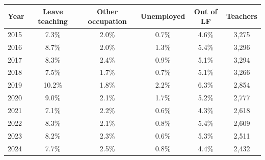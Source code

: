 \begin{tabular}{lccccc}
\toprule
Year & Leave teaching & Other occupation & Unemployed & Out of LF & Teachers \\
\midrule
2015 & 7.3\% & 2.0\% & 0.7\% & 4.6\% & 3,275 \\
2016 & 8.7\% & 2.0\% & 1.3\% & 5.4\% & 3,296 \\
2017 & 8.3\% & 2.4\% & 0.9\% & 5.1\% & 3,294 \\
2018 & 7.5\% & 1.7\% & 0.7\% & 5.1\% & 3,266 \\
2019 & 10.2\% & 1.8\% & 2.2\% & 6.3\% & 2,854 \\
2020 & 9.0\% & 2.1\% & 1.7\% & 5.2\% & 2,777 \\
2021 & 7.1\% & 2.2\% & 0.6\% & 4.3\% & 2,618 \\
2022 & 8.3\% & 2.1\% & 0.8\% & 5.4\% & 2,609 \\
2023 & 8.2\% & 2.3\% & 0.6\% & 5.3\% & 2,511 \\
2024 & 7.7\% & 2.5\% & 0.8\% & 4.4\% & 2,432 \\
\bottomrule
\end{tabular}

